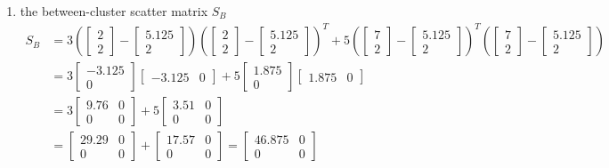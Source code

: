 \documentclass[12pt]{article}
\begin{document}
\begin{enumerate}
\item the between-cluster scatter matrix $S_B$
$$ \begin{aligned} S_B &= 3\left(\begin{bmatrix} 2 \\ 2 \end{bmatrix} - \begin{bmatrix} 5.125 \\ 2 \end{bmatrix} \right)\left(\begin{bmatrix} 2 \\ 2 \end{bmatrix} - \begin{bmatrix} 5.125 \\ 2 \end{bmatrix} \right)^T + 5\left(\begin{bmatrix} 7 \\ 2 \end{bmatrix} - \begin{bmatrix} 5.125 \\ 2 \end{bmatrix} \right)^T \left(\begin{bmatrix} 7 \\ 2 \end{bmatrix} - \begin{bmatrix} 5.125 \\ 2 \end{bmatrix} \right) \\ &= 3 \begin{bmatrix} -3.125 \\ 0 \end{bmatrix} \begin{bmatrix} -3.125 & 0 \end{bmatrix} + 5 \begin{bmatrix} 1.875 \\ 0 \end{bmatrix} \begin{bmatrix} 1.875 & 0 \end{bmatrix} \\ &= 3 \begin{bmatrix} 9.76 & 0 \\ 0 & 0 \end{bmatrix} + 5 \begin{bmatrix} 3.51 & 0 \\ 0 & 0  \end{bmatrix} \\ &= \begin{bmatrix} 29.29 & 0 \\ 0 & 0 \end{bmatrix} + \begin{bmatrix} 17.57 & 0 \\ 0 & 0 \end{bmatrix} = \begin{bmatrix} 46.875 & 0 \\ 0 & 0 \end{bmatrix} 
\end{aligned} $$ 


\end{enumerate}
\end{document}
